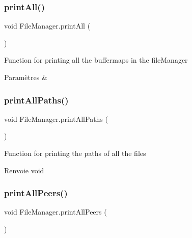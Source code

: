 \subsubsection{\texorpdfstring{print\+All()}{printAll()}}
{\footnotesize\ttfamily void File\+Manager.\+print\+All (\begin{DoxyParamCaption}{ }\end{DoxyParamCaption})\hspace{0.3cm}{\ttfamily [inline]}}

Function for printing all the buffermaps in the file\+Manager 
\begin{DoxyParams}{Paramètres}
{\em } & \\
\hline
\end{DoxyParams}
\mbox{\label{classFileManager_a4f22816aaf2c5695b0e365eb88c41acf}} 
\subsubsection{\texorpdfstring{print\+All\+Paths()}{printAllPaths()}}
{\footnotesize\ttfamily void File\+Manager.\+print\+All\+Paths (\begin{DoxyParamCaption}{ }\end{DoxyParamCaption})\hspace{0.3cm}{\ttfamily [inline]}}

Function for printing the paths of all the files

\begin{DoxyReturn}{Renvoie}
void 
\end{DoxyReturn}
\mbox{\label{classFileManager_a1ff7d7a1192210cc29a88609b9c1844d}} 
\subsubsection{\texorpdfstring{print\+All\+Peers()}{printAllPeers()}}
{\footnotesize\ttfamily void File\+Manager.\+print\+All\+Peers (\begin{DoxyParamCaption}{ }\end{DoxyParamCaption})\hspace{0.3cm}{\ttfamily [inline]}}

